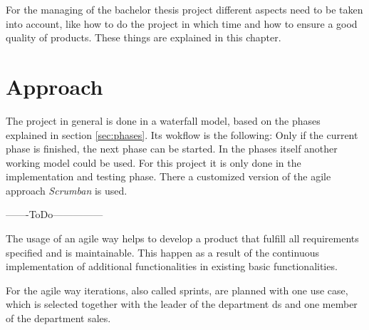 For the managing of the bachelor thesis project different aspects need to be taken into account, like how to do the project in which time and how to ensure a good quality of products. These things are explained in this chapter.

\section{Approach}
The project in general is done in a waterfall model, based on the phases explained in section \ref{sec:phases}. Its wokflow is the following: Only if the current phase is finished, the next phase can be started. In the phases itself another working model could be used. For this project it is only done in the implementation and testing phase. There a customized version of the agile approach \textit{Scrumban} is used.

-------ToDo---------------

The usage of an agile way helps to develop a product that fulfill all requirements specified and is maintainable. This happen as a result of the continuous implementation of additional functionalities in existing basic functionalities. 

For the agile way iterations, also called sprints, are planned with one use case, which is selected together with the leader of the department \gls{ds} and one member of the department sales. 


